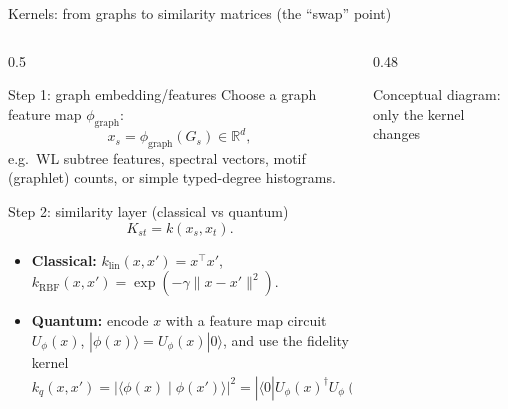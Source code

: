 \documentclass[aspectratio=169,xcolor={dvipsnames}]{beamer}
\renewcommand{\accent}[1]{\textbf{#1}}
\newcommand{\R}{\mathbb{R}}
\begin{document}
\begin{frame}[shrink=30]{Kernels: from graphs to similarity matrices (the “swap” point)}
    \small
    \begin{columns}[T,onlytextwidth]
    \begin{column}{0.5\textwidth}
    \begin{block}{Step 1: graph embedding/features}
    Choose a graph feature map $\phi_{\text{graph}}$:
    \[
    x_s=\phi_{\text{graph}}(G_s)\in\R^d,
    \]
    e.g.\ WL subtree features, spectral vectors, motif (graphlet) counts, or simple typed-degree histograms.
    \end{block}

    \begin{block}{Step 2: similarity layer (classical vs quantum)}
    \[
    K_{st}=k(x_s,x_t).
    \]
    \begin{itemize}\setlength\itemsep{2pt}
    \item \accent{Classical:} $k_{\text{lin}}(x,x')=x^\top x'$, \;\;
    $k_{\text{RBF}}(x,x')=\exp(-\gamma\|x-x'\|^2)$.
    \item \accent{Quantum:} encode $x$ with a feature map circuit $U_\phi(x)$,
    $|\phi(x)\rangle=U_\phi(x)|0\rangle$, and use the fidelity kernel
    \[
    k_q(x,x')=\left|\langle \phi(x)\mid \phi(x')\rangle\right|^2
    =\left|\langle 0|U_\phi(x)^\dagger U_\phi(x')|0\rangle\right|^2.
    \]
    \end{itemize}
    \end{block}
    \end{column}

    \begin{column}{0.48\textwidth}
    \begin{block}{Conceptual diagram: only the kernel changes}
    \centering

    \newcommand{\pipesep}{7mm}   %
    \newcommand{\swapdrop}{7mm}   %
    \newcommand{\diagscale}{0.88} %

\end{block}
\end{column}
\end{columns}
\end{frame}
\end{document}
